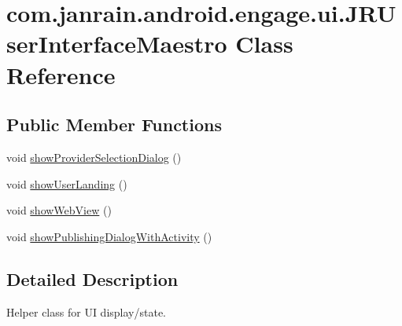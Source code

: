 \hypertarget{classcom_1_1janrain_1_1android_1_1engage_1_1ui_1_1_j_r_user_interface_maestro}{
\section{com.janrain.android.engage.ui.JRUserInterfaceMaestro Class Reference}
\label{classcom_1_1janrain_1_1android_1_1engage_1_1ui_1_1_j_r_user_interface_maestro}
}
\subsection*{Public Member Functions}
\begin{DoxyCompactItemize}
\item 
void \hyperlink{classcom_1_1janrain_1_1android_1_1engage_1_1ui_1_1_j_r_user_interface_maestro_ae527490dca76cf03f24abd86ec0a0649}{showProviderSelectionDialog} ()
\item 
void \hyperlink{classcom_1_1janrain_1_1android_1_1engage_1_1ui_1_1_j_r_user_interface_maestro_a1d1b486a5327468096aafb0f81138f62}{showUserLanding} ()
\item 
void \hyperlink{classcom_1_1janrain_1_1android_1_1engage_1_1ui_1_1_j_r_user_interface_maestro_a04c3f141df1b96d35d472b609d26d0db}{showWebView} ()
\item 
void \hyperlink{classcom_1_1janrain_1_1android_1_1engage_1_1ui_1_1_j_r_user_interface_maestro_af3242bf759f05922d7ff97ea0807ecaf}{showPublishingDialogWithActivity} ()
\end{DoxyCompactItemize}


\subsection{Detailed Description}
Helper class for UI display/state. 

